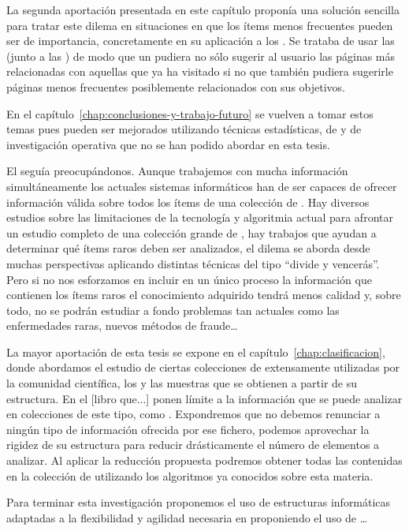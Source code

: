 La segunda aportación presentada en este capítulo proponía una solución sencilla para tratar este dilema en situaciones en que los ítems menos frecuentes pueden ser de importancia, concretamente en su aplicación a los \SRW. Se trataba de usar las \ROPs (junto a las \ARs) de modo que un \srw pudiera no sólo sugerir al usuario las páginas más relacionadas con aquellas que ya ha visitado si no que también pudiera sugerirle páginas menos frecuentes posiblemente relacionados con sus objetivos.

En el capítulo~\ref{chap:conclusiones-y-trabajo-futuro} se vuelven a tomar estos temas pues pueden ser mejorados utilizando técnicas estadísticas, de \clasificacion y de investigación operativa que no se han podido abordar en esta tesis.

El \dilemaIR seguía preocupándonos. Aunque trabajemos con mucha información simultáneamente los actuales sistemas informáticos han de ser capaces de ofrecer información válida sobre todos los ítems de una colección de \transacciones. Hay diversos estudios sobre las limitaciones de la tecnología y algoritmia actual para afrontar un estudio completo de una colección grande de , hay trabajos que ayudan a determinar qué ítems raros deben ser analizados, el dilema se aborda desde muchas perspectivas aplicando distintas técnicas del tipo "`divide y vencerás"'. Pero si no nos esforzamos en incluir en un único proceso la información que contienen los ítems raros el conocimiento adquirido tendrá menos calidad y, sobre todo, no se podrán estudiar a fondo problemas tan actuales como las enfermedades raras, nuevos métodos de fraude\ldots

La mayor aportación de esta tesis se expone en el capítulo~\ref{chap:clasificacion}, donde abordamos el estudio de ciertas colecciones de \transacciones extensamente utilizadas por la comunidad científica, los \catalogos y las muestras que se obtienen a partir de su estructura. En el [libro que...] ponen límite a la información que se puede analizar en colecciones de este tipo, como \mushroom. Expondremos que no debemos renunciar a ningún tipo de información ofrecida por ese fichero, podemos aprovechar la rigidez de su estructura para reducir drásticamente el número de elementos a analizar. Al aplicar la reducción propuesta podremos obtener todas las \ARs contenidas en la colección de \transacciones utilizando los algoritmos ya conocidos sobre esta materia.

Para terminar esta investigación proponemos el uso de estructuras informáticas adaptadas a la flexibilidad y agilidad necesaria en \dm proponiendo el uso de \CCs\ldots


